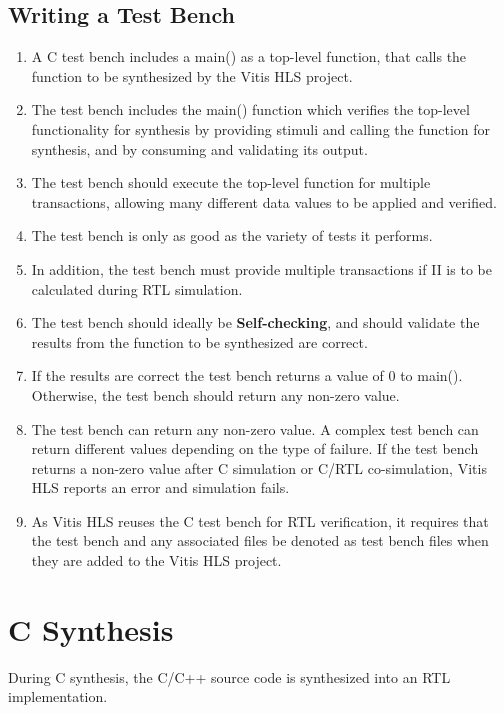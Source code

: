 \subsection{Writing a Test Bench}
\begin{enumerate}
  \item A C test bench includes a main() as a top-level function, that calls the function to be synthesized by the Vitis HLS project.
  \item The test bench includes the main() function which verifies the top-level functionality for synthesis by providing stimuli and calling the function for synthesis, and by consuming and validating its output.
  \item The test bench should execute the top-level function for multiple transactions, allowing many different data values to be applied and verified. 
  \item The test bench is only as good as the variety of tests it performs. 
  \item In addition, the test bench must provide multiple transactions if II is to be calculated during RTL simulation.
  \item The test bench should ideally be \textbf{Self-checking}, and should validate the results from the function to be synthesized are correct.
  \item If the results are correct the test bench returns a value of 0 to main(). Otherwise, the test bench should return any non-zero value.
  \item The test bench can return any non-zero value. A complex test bench can return different values depending on the type of failure. If the test bench returns a non-zero value after C simulation or  C/RTL co-simulation, Vitis HLS reports an error and simulation fails.
  \item As Vitis HLS reuses the C test bench for RTL verification, it requires that the test bench and any associated files be denoted as test bench files when they are added to the Vitis HLS project.
\end{enumerate}


\clearpage
\section{C Synthesis}
During C synthesis, the C/C++ source code is synthesized into an RTL implementation.

